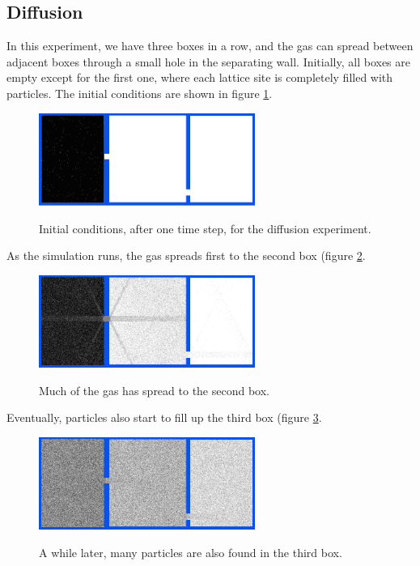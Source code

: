 \documentclass[12pt,a4paper]{article}
\begin{document}
\subsection{Diffusion}
In this experiment, we have three boxes in a row, and the gas can spread between adjacent boxes through a small
hole in the separating wall. Initially, all boxes are empty except for the first one, where each lattice site
is completely filled with particles. The initial conditions are shown in figure \ref{diffusioninit}.

\begin{figure}[htp]
\centering
  \includegraphics[width=200pt]{figs/diffusioninit.png}
\label{diffusioninit}
\caption{Initial conditions, after one time step, for the diffusion experiment.}
\end{figure}

As the simulation runs, the gas spreads first to the second box (figure \ref{diffusionbox2fill}.
\begin{figure}[htp]
\centering
  \includegraphics[width=200pt]{figs/diffusionbox2fill.png}
\label{diffusionbox2fill}
\caption{Much of the gas has spread to the second box.}
\end{figure}

Eventually, particles also start to fill up the third box (figure \ref{diffusionbox3fill}.
\begin{figure}[htp]
\centering
  \includegraphics[width=200pt]{figs/diffusionbox3fill.png}
\label{diffusionbox3fill}
\caption{A while later, many particles are also found in the third box.}
\end{figure}
\end{document}
